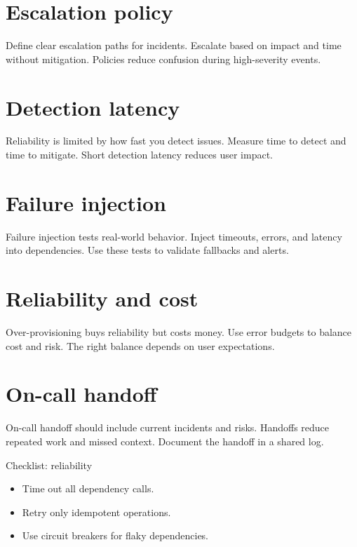 \section{Escalation policy}
Define clear escalation paths for incidents.
Escalate based on impact and time without mitigation.
Policies reduce confusion during high-severity events.

\section{Detection latency}
Reliability is limited by how fast you detect issues.
Measure time to detect and time to mitigate.
Short detection latency reduces user impact.

\section{Failure injection}
Failure injection tests real-world behavior.
Inject timeouts, errors, and latency into dependencies.
Use these tests to validate fallbacks and alerts.

\section{Reliability and cost}
Over-provisioning buys reliability but costs money.
Use error budgets to balance cost and risk.
The right balance depends on user expectations.

\section{On-call handoff}
On-call handoff should include current incidents and risks.
Handoffs reduce repeated work and missed context.
Document the handoff in a shared log.

\begin{checklistbox}{Checklist: reliability}
\begin{itemize}[nosep]
  \item Time out all dependency calls.
  \item Retry only idempotent operations.
  \item Use circuit breakers for flaky dependencies.
\end{itemize}
\end{checklistbox}
